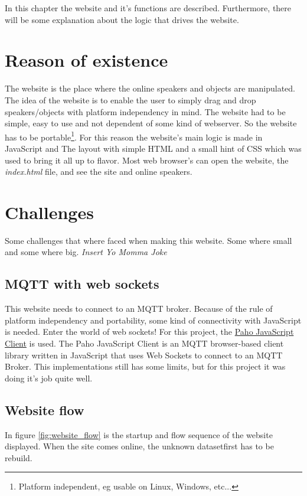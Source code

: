 In this chapter the website and it's functions are described. Furthermore, there will be some explanation about the logic that drives the website.

\section{Reason of existence}
The website is the place where the online speakers and objects are manipulated.
The idea of the website is to enable the user to simply drag and drop speakers/objects with platform independency in mind.
The website had to be simple, easy to use and not dependent of some kind of webserver.
So the website has to be portable\footnote{Platform independent, eg usable on Linux, Windows, etc...}.
For this reason the website's main logic is made in JavaScript and The layout with simple HTML and a small hint of CSS which was used to bring it all up to flavor.
Most web browser's can open the website, the \textit{index.html} file, and see the site and online speakers.

\section{Challenges}
Some challenges that where faced when making this website. Some where small and some where big. {\tiny\textit{Insert Yo Momma Joke}}

\subsection{MQTT with web sockets}
This website needs to connect to an MQTT broker. Because of the rule of platform independency and portability, some kind of connectivity with JavaScript is needed.
Enter the world of web sockets! For this project, the \href{https://github.com/eclipse/paho.mqtt.javascript}{Paho JavaScript Client} is used.
The Paho JavaScript Client is an MQTT browser-based client library written in JavaScript that uses Web Sockets to connect to an MQTT Broker.
This implementations still has some limits\footnotemark, but for this project it was doing it's job quite well.

\subsection{Website flow}
In figure \ref{fig:website_flow} is the startup and flow sequence of the website displayed.
When the site comes online, the unknown dataset\footnotemark first has to be rebuild.

